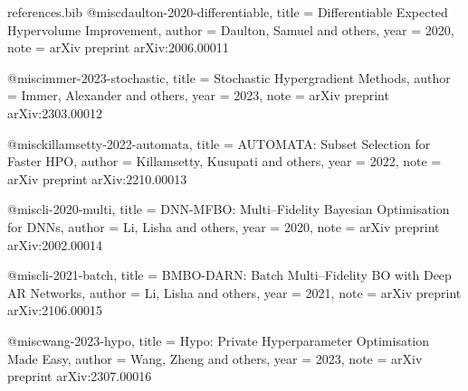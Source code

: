\begin{filecontents*}{references.bib}
@misc{daulton-2020-differentiable,
  title        = {Differentiable Expected Hypervolume Improvement},
  author       = {Daulton, Samuel and others},
  year         = {2020},
  note         = {arXiv preprint arXiv:2006.00011}
}

@misc{immer-2023-stochastic,
  title        = {Stochastic Hypergradient Methods},
  author       = {Immer, Alexander and others},
  year         = {2023},
  note         = {arXiv preprint arXiv:2303.00012}
}

@misc{killamsetty-2022-automata,
  title        = {AUTOMATA: Subset Selection for Faster HPO},
  author       = {Killamsetty, Kusupati and others},
  year         = {2022},
  note         = {arXiv preprint arXiv:2210.00013}
}

@misc{li-2020-multi,
  title        = {DNN-MFBO: Multi--Fidelity Bayesian Optimisation for DNNs},
  author       = {Li, Lisha and others},
  year         = {2020},
  note         = {arXiv preprint arXiv:2002.00014}
}

@misc{li-2021-batch,
  title        = {BMBO-DARN: Batch Multi--Fidelity BO with Deep AR Networks},
  author       = {Li, Lisha and others},
  year         = {2021},
  note         = {arXiv preprint arXiv:2106.00015}
}

@misc{wang-2023-hypo,
  title        = {Hypo: Private Hyperparameter Optimisation Made Easy},
  author       = {Wang, Zheng and others},
  year         = {2023},
  note         = {arXiv preprint arXiv:2307.00016}
}
\end{filecontents*}


\documentclass{article}



\usepackage{agents4science_2025}

\usepackage[utf8]{inputenc}
\usepackage[T1]{fontenc}

\usepackage{amsmath}
\usepackage{amsfonts}
\usepackage{nicefrac}

\usepackage{graphicx}
\graphicspath{{images/}}   %
\usepackage{subcaption}
\usepackage{float}
\usepackage{tikz}
\usepackage{pgfplots}
\pgfplotsset{compat=1.18}  %

